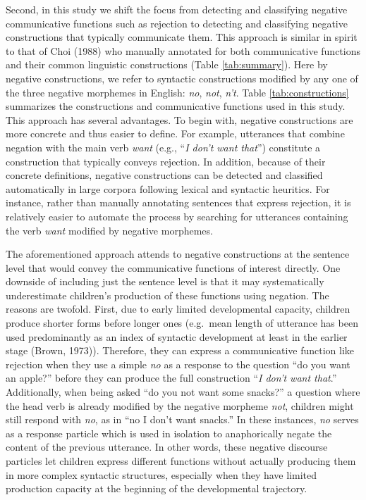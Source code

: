 \documentclass[
  english,
  man,floatsintext]{apa6}
\begin{document}
Second, in this study we shift the focus from detecting and classifying negative communicative functions such as rejection to detecting and classifying negative constructions that typically communicate them. This approach is similar in spirit to that of Choi (1988) who manually annotated for both communicative functions and their common linguistic constructions (Table \ref{tab:summary}). Here by negative constructions, we refer to syntactic constructions modified by any one of the three negative morphemes in English: \emph{no}, \emph{not}, \emph{n't}. Table \ref{tab:constructions} summarizes the constructions and communicative functions used in this study. This approach has several advantages. To begin with, negative constructions are more concrete and thus easier to define. For example, utterances that combine negation with the main verb \emph{want} (e.g., ``\emph{I don't want that}'') constitute a construction that typically conveys rejection. In addition, because of their concrete definitions, negative constructions can be detected and classified automatically in large corpora following lexical and syntactic heuritics. For instance, rather than manually annotating sentences that express rejection, it is relatively easier to automate the process by searching for utterances containing the verb \emph{want} modified by negative morphemes.

The aforementioned approach attends to negative constructions at the sentence level that would convey the communicative functions of interest directly. One downside of including just the sentence level is that it may systematically underestimate children's production of these functions using negation. The reasons are twofold. First, due to early limited developmental capacity, children produce shorter forms before longer ones (e.g.~mean length of utterance has been used predominantly as an index of syntactic development at least in the earlier stage (Brown, 1973)). Therefore, they can express a communicative function like rejection when they use a simple \emph{no} as a response to the question ``do you want an apple?'' before they can produce the full construction ``\emph{I don't want that}.'' Additionally, when being asked ``do you not want some snacks?'' a question where the head verb is already modified by the negative morpheme \emph{not}, children might still respond with \emph{no}, as in ``no I don't want snacks.'' In these instances, \emph{no} serves as a response particle which is used in isolation to anaphorically negate the content of the previous utterance. In other words, these negative discourse particles let children express different functions without actually producing them in more complex syntactic structures, especially when they have limited production capacity at the beginning of the developmental trajectory.
\end{document}
